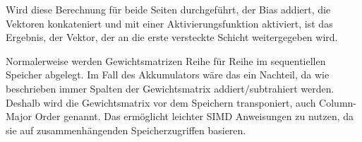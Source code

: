 Wird diese Berechnung für beide Seiten durchgeführt, der Bias addiert, die Vektoren konkateniert und mit einer Aktivierungsfunktion aktiviert, ist das Ergebnis, der Vektor, der an die erste versteckte Schicht weitergegeben wird.

Normalerweise werden Gewichtsmatrizen Reihe für Reihe im sequentiellen Speicher abgelegt. Im Fall des Akkumulators wäre das ein Nachteil, da wie beschrieben immer Spalten der Gewichtsmatrix addiert/subtrahiert werden. Deshalb wird die Gewichtsmatrix vor dem Speichern transponiert, auch Column-Major Order genannt. Das ermöglicht leichter \ac{SIMD} Anweisungen zu nutzen, da sie auf zusammenhängenden Speicherzugriffen basieren.
